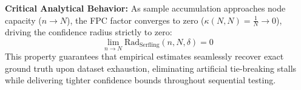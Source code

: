 \noindent\textbf{Critical Analytical Behavior:} As sample accumulation approaches node capacity ($n \to N$), the FPC factor converges to zero ($\kappa(N, N) = \frac{1}{N} \to 0$), driving the confidence radius strictly to zero:
\begin{equation}
\lim_{n \to N} \text{Rad}_{\text{Serfling}}(n, N, \delta) = 0
\end{equation}
This property guarantees that empirical estimates seamlessly recover exact ground truth upon dataset exhaustion, eliminating artificial tie-breaking stalls while delivering tighter confidence bounds throughout sequential testing.
